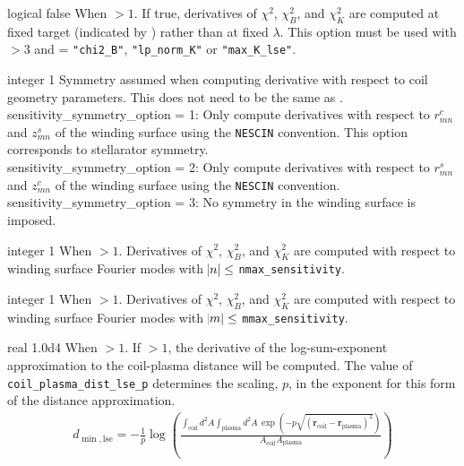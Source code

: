 \myhrule

{logical}
{false}
{When  $> 1$.}
{If true, derivatives of $\chi^2$, $\chi^2_B$, and $\chi^2_K$ are computed at fixed target (indicated by ) rather than at fixed $\lambda$. This option must be used with  $> 3$ and  = \texttt{"chi2\_B"}, \texttt{"lp\_norm\_K"} or \texttt{"max\_K\_lse"}.}

\myhrule

{integer}
{1}
{Symmetry assumed when computing derivative with respect to coil geometry parameters. This does not need to be the same as .}
{\\
{\ttfamily sensitivity\_symmetry\_option = 1}: Only compute derivatives with respect to $r_{mn}^c$ and $z_{mn}^s$ of the winding surface using the \texttt{NESCIN} convention. This option corresponds to stellarator symmetry. \\
{\ttfamily sensitivity\_symmetry\_option = 2}: Only compute derivatives with respect to $r_{mn}^s$ and $z_{mn}^c$ of the winding surface using the \texttt{NESCIN} convention. \\
{\ttfamily sensitivity\_symmetry\_option = 3}: No symmetry in the winding surface is imposed.}

\myhrule

{integer}
{1}
{When  $> 1$.}
{Derivatives of $\chi^2$, $\chi^2_B$, and $\chi^2_K$ are computed with respect to winding surface Fourier modes with $\abs{n} \leq$ \texttt{nmax\_sensitivity}.}

\myhrule

{integer}
{1}
{When  $> 1$.}
{Derivatives of $\chi^2$, $\chi^2_B$, and $\chi^2_K$ are computed with respect to winding surface Fourier modes with $\abs{m} \leq$ \texttt{mmax\_sensitivity}.}

\myhrule

{real}
{1.0d4}
{When $> 1$.}
{If  $> 1$, the derivative of the log-sum-exponent approximation to the coil-plasma distance will be computed. The value of \texttt{coil\_plasma\_dist\_lse\_p} determines the scaling, $p$, in the exponent for this form of the distance approximation.
\begin{gather}
d_{\min,\text{lse}} = - \frac{1}{p} \log \left( \frac{ \int_{\text{coil}} d^2 A \int_{\text{plasma}} d^2 A \, \exp \left( - p \sqrt{ (\bm{r}_{\text{coil}}- \bm{r}_{\text{plasma}})^2} \right)}{A_{\text{coil}} A_{\text{plasma}}} \right)
\end{gather}
 }

